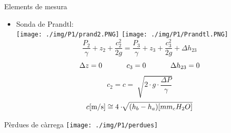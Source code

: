 \documentclass[10pt]{beamer}
\begin{document}
\begin{frame}{Elements de mesura}
  \begin{itemize}
    \item Sonda de Prandtl:\\
      \texttt{[image: ./img/P1/prand2.PNG]}\hspace{0.07\linewidth}
      \texttt{[image: ./img/P1/Prandtl.PNG]}
      \begin{equation*}
        \frac{P_2}{\gamma} + z_2 + \frac{c_2 ^2}{2g} =\frac{P_3}{\gamma} + z_3 + \frac{c_3 ^2}{2g} + \Delta h_{23}
      \end{equation*}
      \begin{equation*}
        \Delta z = 0 \hspace{1.2cm} c_3 = 0\hspace{1.2cm} \Delta h_{23} = 0
      \end{equation*}
      \begin{equation*}
        c_2 = c = \sqrt[]{2\cdot g \cdot \frac{\Delta P}{\gamma}}
      \end{equation*}
      \begin{equation*}
        c\hbox{[m/s]} \cong 4\cdot \sqrt[]{(h_b - h_a)[{mm}_cH_2O]}
      \end{equation*}
  \end{itemize}
\end{frame}

\begin{frame}{Pèrdues de càrrega}
  \texttt{[image: ./img/P1/perdues]}
\end{frame}
\end{document}
